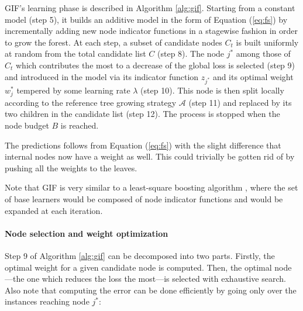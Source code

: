 \documentclass{article}
\begin{document}

GIF's learning phase is described in Algorithm \ref{alg:gif}.
Starting from a constant model (step 5), it builds an additive model in the 
form of Equation (\ref{eq:fs}) by incrementally adding new node indicator 
functions in a stagewise fashion in order to grow the forest.
At each step, a subset of candidate nodes $C_t$ is built uniformly at random 
from the total candidate list $C$ (step 8). The node $j^*$ among those of $C_t$ 
which contributes the most to a decrease of the global loss is selected (step 
9) and introduced in the model via its indicator function $z_{j^*}$ and its 
optimal weight $w^*_j$ tempered by some learning rate $\lambda$ (step 10). This 
node is then split locally according to the reference tree growing strategy 
$\mathcal{A}$ (step 11) and replaced by its two children in the candidate list 
(step 12). The process is stopped when the node budget $B$ is reached. 

The predictions follows from Equation (\ref{eq:fs}) with the slight difference 
that 
internal nodes now have a weight as well. This could trivially be gotten rid of 
by pushing all the weights to the leaves.


Note that GIF is very similar to a least-square boosting algorithm
\cite{hastie2009}, where the set of base learners would be composed of
node indicator functions and would be expanded at each iteration.

\paragraph{Node selection and weight optimization}
Step 9 of Algorithm \ref{alg:gif} can be decomposed into two parts. Firstly, 
the optimal weight for a given candidate node is computed. Then, the optimal 
node---the one which reduces the loss the most---is selected with 
exhaustive search. Also note that computing the error can be done efficiently 
by going only over the instances reaching node $j^*$:
\end{document}
